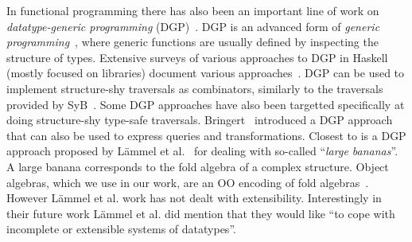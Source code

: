 In functional programming there has also been an important line of
work on \emph{datatype-generic programming} (DGP)~\cite{Gibbons07dgp}.  DGP is an
advanced form of \emph{generic programming}~\cite{GP}, where generic
functions are usually defined by inspecting the structure of
types.  Extensive surveys of various approaches to DGP in Haskell
(mostly focused on libraries) document various
approaches~\cite{ComparingGPHaskellRodriquez,ComparingGPHaskellHinze}.
DGP can be used to implement structure-shy traversals as combinators,
similarly to the traversals provided by SyB~\cite{hinze2003fun}. 
Some DGP approaches have also been targetted specifically at doing 
structure-shy type-safe traversals. Bringert~\cite{bjorn08acf}
introduced a DGP approach that can also be used to express queries 
and transformations. Closest to \name is a DGP approach proposed by 
L\"ammel et al.~\cite{lammel00dealing} for dealing with so-called
``\emph{large bananas}''. A large banana corresponds to the fold
algebra of a complex structure. Object algebras, which we use in our 
work, are an OO encoding of fold algebras~\cite{Oliveira08visitor,bruno12oa}.
However L\"ammel et al. work has not dealt with extensibility. Interestingly 
in their future work  L\"ammel et al. did mention that they would like ``to cope 
with incomplete or extensible systems of datatypes''. 

\begin{comment} 
In that
approach for generalized and basic folds. These fold algebras scale up
applications involving large systems of mutually recursive
datatypes. These works all try to optimize traversal control of large
structures in functional programming paradigm, while our work solves a
similar problem in Object Algebras, a programming style in Object
Oriented Programming paradigm.
\end{comment}


